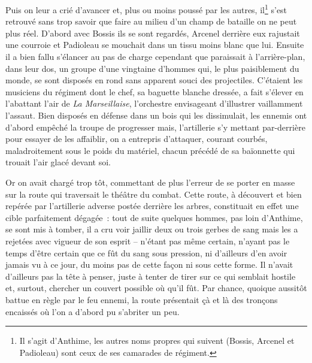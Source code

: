 
{

Puis on leur a crié d'avancer et, plus ou moins poussé par les autres,
il\footnote{Il s'agit d'Anthime, les autres noms propres qui suivent
(Bossis, Arcenel et Padioleau) sont ceux de ses camarades de
régiment.} s'est retrouvé sans trop savoir que faire au milieu d'un
champ de bataille on ne peut plus réel. D'abord avec Bossis ils se
sont regardés, Arcenel derrière eux rajustait une courroie et
Padioleau se mouchait dans un tissu moins blanc que lui. Ensuite il a
bien fallu s'élancer au pas de charge cependant que paraissait à
l'arrière-plan, dans leur dos, un groupe d'une vingtaine d'hommes
qui, le plus paisiblement du monde, se sont disposés en rond sans
apparent souci des projectiles. C'étaient les musiciens du régiment
dont le chef, sa baguette blanche dressée, a fait s'élever en
l'abattant l'air de \textit{La Marseillaise}, l'orchestre envisageant
d'illustrer vaillamment l'assaut. Bien disposés en défense dans un
bois qui les dissimulait, les ennemis ont d'abord empêché la troupe
de progresser mais, l'artillerie s'y mettant par-derrière pour
essayer de les affaiblir, on a entrepris d'attaquer, courant courbés,
maladroitement sous le poids du matériel, chacun précédé de sa
baïonnette qui trouait l'air glacé devant soi.

Or on avait chargé trop tôt, commettant de plus l'erreur de se porter
en masse sur la route qui traversait le théâtre du combat. Cette
route, à découvert et bien repérée par l'artillerie adverse postée
derrière les arbres, constituait en effet une cible parfaitement
dégagée~: tout de suite quelques hommes, pas loin d'Anthime, se sont
mis à tomber, il a cru voir jaillir deux ou trois gerbes de sang mais
les a rejetées avec vigueur de son esprit – n'étant pas même certain,
n'ayant pas le temps d'être certain que ce fût du sang sous pression,
ni d'ailleurs d'en avoir jamais vu à ce jour, du moins pas de cette
façon ni sous cette forme. Il n'avait d'ailleurs pas la tête à
penser, juste à tenter de tirer sur ce qui semblait hostile et,
surtout, chercher un couvert possible où qu'il fût. Par chance,
quoique aussitôt battue en règle par le feu ennemi, la route
présentait çà et là des tronçons encaissés où l'on a d'abord pu
s'abriter un peu.

}
